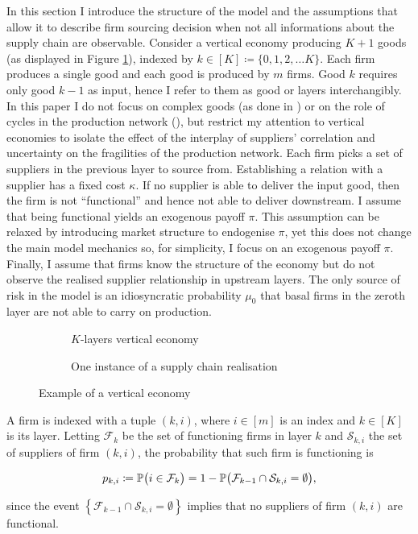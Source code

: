 \documentclass[../../main.tex]{subfiles}
\begin{document}
In this section I introduce the structure of the model and the assumptions that allow it to describe firm sourcing decision when not all informations about the supply chain are observable. Consider a vertical economy producing $K + 1$ goods (as displayed in Figure \ref{fig:vertical-economy-diagram}), indexed by $k \in [K] \coloneqq \{ 0, 1, 2, \ldots K \}$. Each firm produces a single good and each good is produced by $m$ firms. Good $k$ requires only good $k - 1$ as input, hence I  refer to them as good or layers interchangibly. In this paper I do not focus on complex goods (as done in ) or on the role of cycles in the production network (\cite{acemoglu_network_2012,baqaee_macroeconomic_2019}), but restrict my attention to vertical economies to isolate the effect of the interplay of suppliers' correlation and uncertainty on the fragilities of the production network. Each firm picks a set of suppliers in the previous layer to source from. Establishing a relation with a supplier has a fixed cost $\kappa$. If no supplier is able to deliver the input good, then the firm is not ``functional'' and hence not able to deliver downstream. I assume that being functional yields an exogenous payoff $\pi$. This assumption can be relaxed by introducing market structure to endogenise $\pi$, yet this does not change the main model mechanics so, for simplicity, I  focus on an exogenous payoff $\pi$. Finally, I assume that firms know the structure of the economy but do not observe the realised supplier relationship in upstream layers. The only source of risk in the model is an idiosyncratic probability $\mu_0$ that basal firms in the zeroth layer are not able to carry on production.


\begin{figure}[H]
  \centering
  \begin{subfigure}{.5\textwidth}
    \centering
    \caption{$K$-layers vertical economy}
    \label{fig:vertical-economy-diagram}
  \end{subfigure}%
  \begin{subfigure}{.5\textwidth}
    \centering
    \caption{One instance of a supply chain realisation}
    \label{fig:vertical-economy-diagram:suppliers}
  \end{subfigure}
  \caption{Example of a vertical economy}
  \label{fig:gf}
\end{figure}


A firm is indexed with a tuple $(k, i)$, where $i \in [m]$ is an index and $k \in [K]$ is its layer. Letting $\mathcal{F}_k$ be the set of functioning firms in layer $k$ and $\mathcal{S}_{k, i}$ the set of suppliers of firm $(k, i)$, the probability that such firm is functioning is

\begin{equation} \label{eq:functional_probability}
  p_{k, i} \coloneqq \P\big( i \in \mathcal{F}_k \big) = 1 - \P\big( \mathcal{F}_{k - 1} \cap \mathcal{S}_{k, i} = \emptyset \big),
\end{equation}

since the event $\left\{ \mathcal{F}_{k - 1} \cap \mathcal{S}_{k, i} = \emptyset \right\}$ implies that no suppliers of firm $(k, i)$ are functional.
\end{document}
